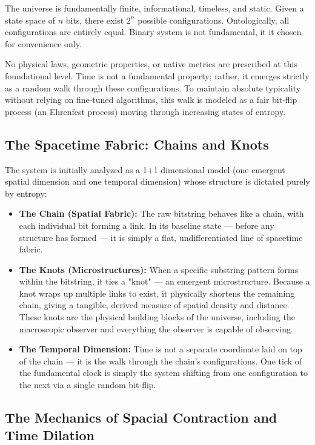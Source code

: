 The universe is fundamentally finite, informational, timeless, and static. Given a state space of $n$ bits, there exist $2^n$ possible configurations. Ontologically, all configurations are entirely equal. Binary system is not fundamental, it it chosen for convenience only.

No physical laws, geometric properties, or native metrics are prescribed at this foundational level. Time is not a fundamental property; rather, it emerges strictly as a random walk through these configurations. To maintain absolute typicality without relying on fine-tuned algorithms, this walk is modeled as a fair bit-flip process (an Ehrenfest process) moving through increasing states of entropy.


\subsection{The Spacetime Fabric: Chains and Knots}

The system is initially analyzed as a 1+1 dimensional model (one emergent spatial dimension and one temporal dimension) whose structure is dictated purely by entropy:

\begin{itemize}
\item \textbf{The Chain (Spatial Fabric):} The raw bitstring behaves like a chain, with each individual bit forming a link.
In its baseline state — before any structure has formed — it is simply a flat, undifferentiated line of spacetime fabric.
\item \textbf{The Knots (Microstructures):} When a specific substring pattern forms within the bitstring, it ties a "knot" — an emergent microstructure.
Because a knot wraps up multiple links to exist, it physically shortens the remaining chain, giving a tangible, derived measure of spatial density and distance.
These knots are the physical building blocks of the universe, including the macroscopic observer and everything the observer is capable of observing.
\item \textbf{The Temporal Dimension:} Time is not a separate coordinate laid on top of the chain — it is the walk through the chain's configurations.
One tick of the fundamental clock is simply the system shifting from one configuration to the next via a single random bit-flip.
\end{itemize}

\subsection{The Mechanics of Spacial Contraction and Time Dilation}

